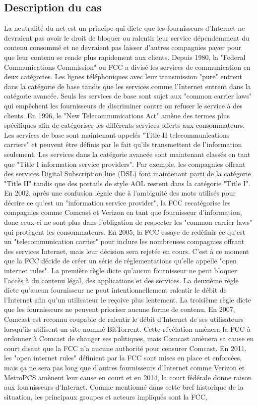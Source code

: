 \documentclass[12pt]{article}
\begin{document}
\subsection{Description du cas}
La neutralité du net est un principe qui dicte que les fournisseurs d'Internet ne devraient pas avoir le droit de bloquer ou ralentir leur service dépendemment du contenu consommé et ne devraient pas laisser d'autres compagnies payer pour que leur contenu se rende plus rapidement aux clients. Depuis 1980, la "Federal Communications Commission" ou FCC a divisé les services de communication en deux catégories. Les lignes téléphoniques avec leur transmission "pure" entrent dans la catégorie de base tandis que les services comme l'Internet entrent dans la catégorie avancée. Seuls les services de base sont sujet aux "common carrier laws" qui empêchent les fournisseurs de discriminer contre ou refuser le service à des clients. En 1996, le "New Telecommunications Act" amène des termes plus spécifiques afin de catégoriser les différents services offerts aux consommateurs. Les services de base sont maintenant appelés "Title II telecommunications carriers" et peuvent être définis par le fait qu'ils transmettent de l'information seulement. Les services dans la catégorie avancée sont maintenant classés en tant que "Title I information service providers". Par exemple, les compagnies offrant des services Digital Subscription line (DSL) font maintenant parti de la catégorie "Title II" tandis que des portails de style AOL restent dans la catégorie "Title I". En 2002, après une confusion légale due à l'ambiguité des mots utilisés pour décrire ce qu'est un "information service provider", la FCC recatégorise les compagnies comme Comcast et Verizon en tant que fournisseur d'information, donc ceux-ci ne sont plus dans l'obligation de respecter les "common carrier laws" qui protègent les consommateurs. En 2005, la FCC essaye de redéfinir ce qu'est un "telecommunication carrier" pour inclure les nombreuses compagnies offrant des services Internet, mais leur décision sera rejetée en cours. C'est à ce moment que la FCC décide de créer un série de réglementations qu'elle appelle "open internet rules". La première règle dicte qu'aucun fournisseur ne peut bloquer l'accès à du contenu légal, des applications et des services. La deuxième règle dicte qu'aucun fournisseur ne peut intentionnellement ralentir le débit de l'Internet afin qu'un utilisateur le reçoive plus lentement. La troisième règle dicte que les fournisseurs ne peuvent prioriser aucune forme de contenu. En 2007, Comcast est reconnu coupable de ralentir le débit d'Internet de ses utilisateurs lorsqu'ils utilisent un site nommé BitTorrent. Cette révélation amènera la FCC à ordonner à Comcast de changer ses politiques, mais Comcast amènera sa cause en court disant que la FCC n'a aucune authorité pour censurer Comcast. En 2011, les "open internet rules" définient par la FCC sont mises en place et enforcées, mais ça ne sera pas long que d'autres fournisseurs d'Internet comme Verizon et MetroPCS amènent leur cause en court et en 2014, la court fédérale donne raison aux fournisseurs d'Internet. Comme mentionné dans cette bref historique de la situation, les principaux groupes et acteurs impliqués sont la FCC, 
\end{document}
